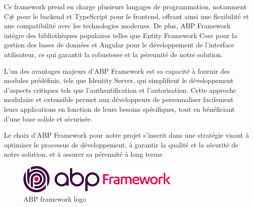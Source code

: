 Ce framework prend en charge plusieurs langages de programmation, notamment C\# pour le backend et TypeScript pour le frontend, offrant ainsi une flexibilité et une compatibilité avec les technologies modernes. De plus, ABP Framework intègre des bibliothèques populaires telles que Entity Framework Core pour la gestion des bases de données et Angular pour le développement de l'interface utilisateur, ce qui garantit la robustesse et la pérennité de notre solution.

L'un des avantages majeurs d'ABP Framework est sa capacité à fournir des modules prédéfinis, tels que Identity Server, qui simplifient le développement d'aspects critiques tels que l'authentification et l'autorisation. Cette approche modulaire et extensible permet aux développeurs de personnaliser facilement leurs applications en fonction de leurs besoins spécifiques, tout en bénéficiant d'une base solide et sécurisée.

Le choix d'ABP Framework pour notre projet s'inscrit dans une stratégie visant à optimiser le processus de développement, à garantir la qualité et la sécurité de notre solution, et à assurer sa pérennité à long terme
\\
\begin{figure}[H] 
    \centering
    \includegraphics[width=8cm]{Figures/abp.png}
        \caption{ABP framework logo}
\end{figure}






